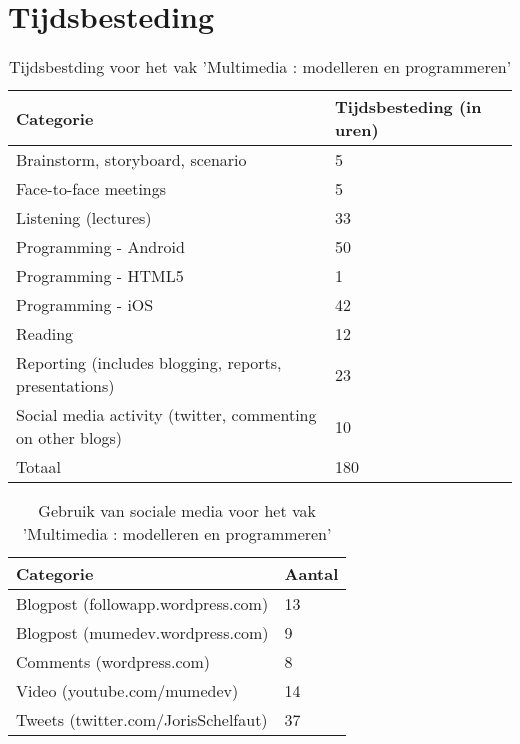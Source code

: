 
\chapter{Tijdsbesteding}\label{appendix:tijdsbesteding}

\begin{table}[h]
\caption{Tijdsbestding voor het vak 'Multimedia : modelleren en programmeren'}
\begin{center}
	\begin{tabular}{ l l } %
		\hline
		\textbf{Categorie}																					& \textbf{Tijdsbesteding} (in uren) \\
		\hline
		Brainstorm, storyboard, scenario 														& 5 																\\
		Face-to-face meetings																				& 5 																\\
		Listening (lectures) 																				& 33 																\\
		Programming - Android 																			& 50 																\\
		Programming - HTML5																					& 1 																\\
		Programming - iOS 																					& 42 																\\
		Reading 																										& 12 																\\
		Reporting (includes blogging, reports, presentations) 			& 23 																\\
		Social media activity (twitter, commenting on other blogs) 	& 10																\\
		\hline
		Totaal																											& 180																\\
		\hline
	\end{tabular}
\end{center}
\label{tab:tijdsbesteding}
\end{table}


\begin{table}[h]
\caption{Gebruik van sociale media voor het vak 'Multimedia : modelleren en programmeren'}
\begin{center}
	\begin{tabular}{ l l } %
		\hline
		\textbf{Categorie}																		& \textbf{Aantal} \\
		\hline
		Blogpost (followapp.wordpress.com) 										& 13 							\\
		Blogpost (mumedev.wordpress.com) 											& 9 							\\
		Comments (wordpress.com)															& 8								\\
		Video 	 (youtube.com/mumedev) 												& 14 							\\
		Tweets	 (twitter.com/JorisSchelfaut)									& 37 							\\
		\hline
	\end{tabular}
\end{center}
\label{tab:social_media}
\end{table}





